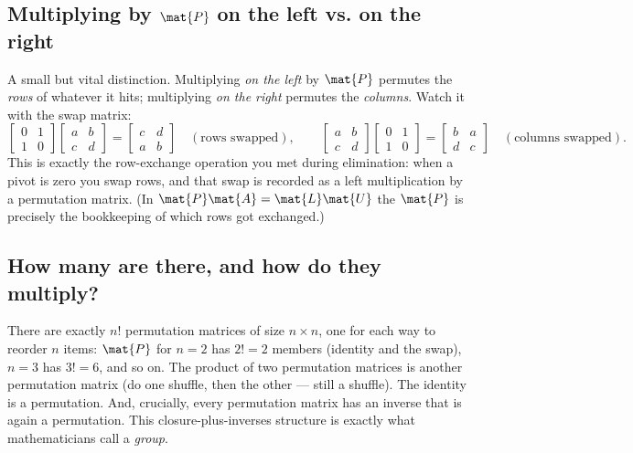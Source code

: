 \subsection{Multiplying by $\mat{P}$ on the left vs. on the right}

A small but vital distinction. Multiplying \emph{on the left} by $\mat{P}$ permutes the \emph{rows} of
whatever it hits; multiplying \emph{on the right} permutes the \emph{columns}. Watch it with the swap
matrix:
\[
  \begin{bmatrix}0&1\\1&0\end{bmatrix}
  \begin{bmatrix}a&b\\c&d\end{bmatrix}
  = \begin{bmatrix}c&d\\a&b\end{bmatrix}
  \quad(\text{rows swapped}),
  \qquad
  \begin{bmatrix}a&b\\c&d\end{bmatrix}
  \begin{bmatrix}0&1\\1&0\end{bmatrix}
  = \begin{bmatrix}b&a\\d&c\end{bmatrix}
  \quad(\text{columns swapped}).
\]
This is exactly the row-exchange operation you met during elimination: when a pivot is zero you swap
rows, and that swap is recorded as a left multiplication by a permutation matrix. (In $\mat{P}\mat{A}=\mat{L}\mat{U}$
the $\mat{P}$ is precisely the bookkeeping of which rows got exchanged.)

\subsection{How many are there, and how do they multiply?}

There are exactly $n!$ permutation matrices of size $n\times n$, one for each way to reorder $n$
items: $\mat{P}$ for $n=2$ has $2!=2$ members (identity and the swap), $n=3$ has $3!=6$, and so on.
The product of two permutation matrices is another permutation matrix (do one shuffle, then the
other --- still a shuffle). The identity is a permutation. And, crucially, every permutation matrix
has an inverse that is again a permutation. This closure-plus-inverses structure is exactly what
mathematicians call a \emph{group}.

